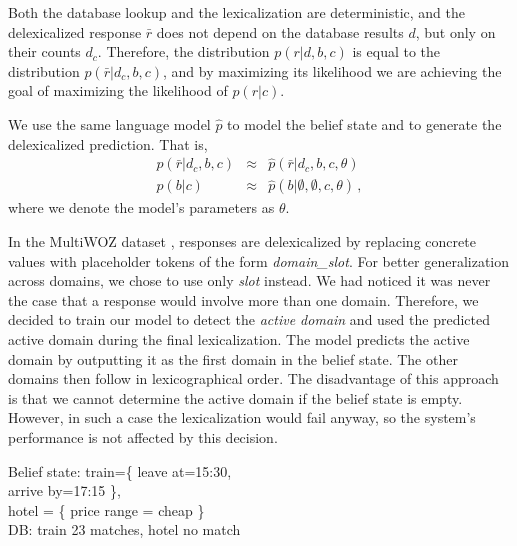 \documentclass[11pt,a4paper]{article}
\newcommand{\augpt}[0]{our model\xspace}
\begin{document}
Both the database lookup and the lexicalization are deterministic, and the delexicalized response $\bar{r}$ does not depend on the database results $d$, but only on their counts $d_c$. Therefore, the distribution $p(r|d,b,c)$ is equal to the distribution $p(\bar{r}|d_c,b,c)$, and by maximizing its likelihood we are achieving the goal of maximizing the likelihood of $p(r|c)$.

We use the same language model $\hat{p}$ to model the belief state and to generate the delexicalized prediction. That is,
\begin{eqnarray}
    p(\bar{r}|d_c,b,c) & \approx & \hat{p}(\bar{r}|d_c,b,c,\theta) \\
    p(b|c) &  \approx&  \hat{p}(b|\emptyset,\emptyset,c,\theta)\,,
\end{eqnarray}
where we denote the model's parameters as $\theta$.

In the MultiWOZ dataset \cite[see Section~\ref{sec:experiments}]{budzianowski2018,eric2019}, responses are delexicalized by replacing concrete values with placeholder tokens of the form \textit{domain\_slot}. For better generalization across domains, we chose to use only \textit{slot} instead. We had noticed it was never the case that a response would involve more than one domain. Therefore, we decided to train our model to detect the \textit{active domain} and used the predicted active domain during the final lexicalization. The model predicts the active domain by outputting it as the first domain in the belief state. The other domains then follow in lexicographical order. The disadvantage of this approach is that we cannot determine the active domain if the belief state is empty. However, in such a case the lexicalization would fail anyway, so the system's performance is not affected by this decision.

\begin{example}
\begin{mdframed}[style=ExampleFrame]
Belief state: train=\{ leave at=15:30, \\ 
\-\hspace{10pt}arrive by=17:15 \}, \\
\-\hspace{10pt}hotel = \{ price range = cheap \} \\
DB: train 23 matches, hotel no match
\end{mdframed}
\caption{String format for \augpt's belief state and database result count\label{ex:augpt_format}.}
\end{example}
\end{document}
